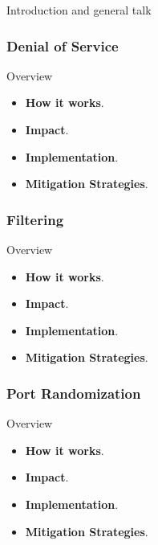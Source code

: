 \documentclass[iwp,first]{luthesis}
\begin{document}
Introduction and general talk


\subsubsection {Denial of Service}

Overview

\begin{itemize}

	\item {\bf How it works}.

	\item {\bf Impact}.
 
	\item {\bf Implementation}.

	\item {\bf Mitigation Strategies}.

\end{itemize}


\subsubsection {Filtering}

Overview

\begin{itemize}

	\item {\bf How it works}.

	\item {\bf Impact}.
 
	\item {\bf Implementation}.

	\item {\bf Mitigation Strategies}.

\end{itemize}


\subsubsection {Port Randomization}

Overview

\begin{itemize}

	\item {\bf How it works}.

	\item {\bf Impact}.
 
	\item {\bf Implementation}.

	\item {\bf Mitigation Strategies}.

\end{itemize}
\end{document}
